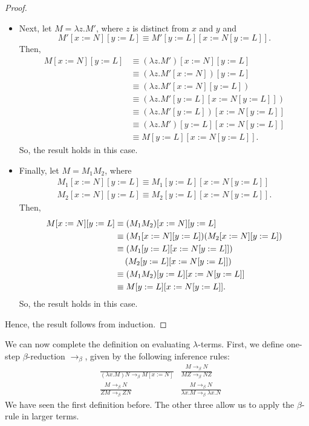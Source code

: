 \documentclass[a4paper, openany]{memoir}
\theoremstyle{definition}
\begin{document}
\begin{proof}
\begin{itemize}
            \item Next, let $M = \lambda z.M'$, where $z$ is distinct from $x$ and $y$ and 
            \[M'[x := N][y := L] \equiv M'[y := L][x := N[y := L]].\]
            Then,
            \begin{align*}
                M[x := N][y := L] &\equiv (\lambda z.M')[x := N][y := L] \\
                &\equiv (\lambda z.M'[x := N])[y := L] \\
                &\equiv (\lambda z.M'[x := N][y := L]) \\
                &\equiv (\lambda z.M'[y := L][x := N[y := L]]) \\
                &\equiv (\lambda z.M'[y := L])[x := N[y := L]] \\
                &\equiv (\lambda z.M')[y := L][x := N[y := L]] \\
                &\equiv M[y := L][x := N[y := L]].
            \end{align*}
            So, the result holds in this case.

            \item Finally, let $M = M_1 M_2$, where
            \begin{align*}
                M_1[x := N][y := L] \equiv M_1[y := L][x := N[y := L]] \\
                M_2[x := N][y := L] \equiv M_2[y := L][x := N[y := L]].
            \end{align*}
            Then,
            \begin{align*}
                M[x := N][y := L] &\equiv (M_1 M_2)[x := N][y := L] \\
                &\equiv (M_1 [x := N][y := L]) (M_2[x := N][y := L]) \\
                &\equiv (M_1[y := L][x := N[y := L]]) \\
                &\hspace*{12pt} (M_2[y := L][x := N[y := L]]) \\
                &\equiv (M_1 M_2) [y := L][x := N[y := L]] \\
                &\equiv M[y := L][x := N[y := L]].
            \end{align*}
            So, the result holds in this case.
        \end{itemize}
        Hence, the result follows from induction.
    \end{proof}

    We can now complete the definition on evaluating $\lambda$-terms. First, we define one-step $\beta$-reduction $\to_\beta$, given by the following inference rules:
    \begin{align*}
        & \frac{}{(\lambda x.M)N \to_\beta M[x := N]} & \frac{M \to_\beta N}{MZ \to_\beta NZ} \\
        & \frac{M \to_\beta N}{ZM \to_\beta ZN} & \frac{M \to_\beta N}{\lambda x.M \to_\beta \lambda x.N}
    \end{align*}
    We have seen the first definition before. The other three allow us to apply the $\beta$-rule in larger terms.
\end{document}
